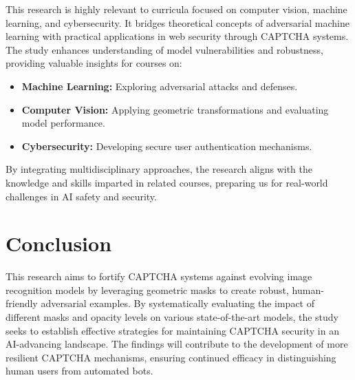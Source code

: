 \documentclass[a4paper,11pt]{article}
\begin{document}
This research is highly relevant to curricula focused on computer vision, machine learning, and cybersecurity. It bridges theoretical concepts of adversarial machine learning with practical applications in web security through CAPTCHA systems. The study enhances understanding of model vulnerabilities and robustness, providing valuable insights for courses on:

\begin{itemize}
    \item \textbf{Machine Learning:} Exploring adversarial attacks and defenses.
    \item \textbf{Computer Vision:} Applying geometric transformations and evaluating model performance.
    \item \textbf{Cybersecurity:} Developing secure user authentication mechanisms.
\end{itemize}

By integrating multidisciplinary approaches, the research aligns with the knowledge and skills imparted in related courses, preparing us for real-world challenges in AI safety and security.

\section*{Conclusion}

This research aims to fortify CAPTCHA systems against evolving image recognition models by leveraging geometric masks to create robust, human-friendly adversarial examples. By systematically evaluating the impact of different masks and opacity levels on various state-of-the-art models, the study seeks to establish effective strategies for maintaining CAPTCHA security in an AI-advancing landscape. The findings will contribute to the development of more resilient CAPTCHA mechanisms, ensuring continued efficacy in distinguishing human users from automated bots.

% 
% 
\end{document}

